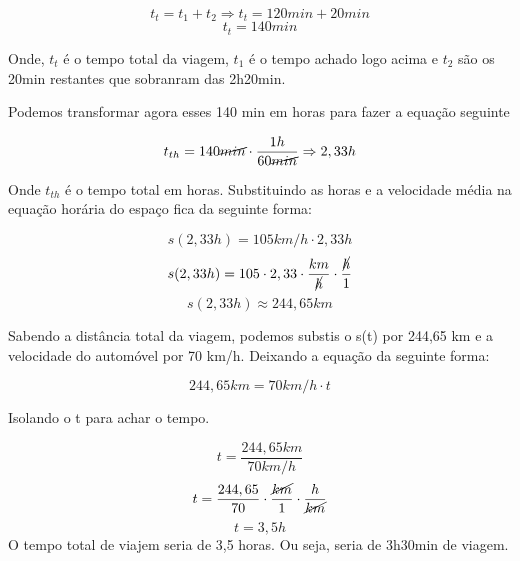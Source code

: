 \documentclass[a4paper, 12pt]{article}
\begin{document}
\begin{flushleft}
		\begin{equation*}
			t_t = t_1 + t_2 \Rightarrow t_t = 120 min + 20 min
		\end{equation*}
		\begin{equation*}
			t_t = 140 min
		\end{equation*}
		
		
		Onde, $t_t$ é o tempo total da viagem, $t_1$ é o tempo achado logo acima e $t_2$ são os 20min restantes que sobranram das 2h20min. 
		
		Podemos transformar agora esses 140 min em horas para fazer a equação seguinte
		
		\begin{equation*}
			t_{th}= 140 \cancel{min} \cdot \frac{1h}{60 \cancel{min}} \Rightarrow 2,33 h 
		\end{equation*}
		
		Onde $t_{th}$ é o tempo total em horas. Substituindo as horas e a velocidade média na equação horária do espaço fica da seguinte forma:
		
		\begin{equation*}
			s(2,33h) =105 km/h \cdot 2,33h
		\end{equation*}
		\begin{equation*}
			s(2,33h) =105 \cdot 2,33 \cdot \frac{km}{\cancel{h}} \cdot \frac{\cancel{h}}{1}
		\end{equation*}
		\begin{equation*}
			s(2,33h) \approx 244,65 km
		\end{equation*}
		
		Sabendo a distância total da viagem, podemos substis o s(t) por 244,65 km e a velocidade do automóvel por 70 km/h. Deixando a equação da seguinte forma:
		
		\begin{equation*}
			244,65 km = 70 km/h \cdot t 
		\end{equation*}
		
		Isolando o t para achar o tempo.
		
		\begin{equation*}
			t = \frac{244,65 km}{70 km/h} 
		\end{equation*}
		\begin{equation*}
			t = \frac{244,65}{70} \cdot \frac{\cancel{km}}{1} \cdot \frac{h}{\cancel{km}} 
		\end{equation*}
		\begin{equation*}
			t = 3,5h 
		\end{equation*}
		O tempo total de viajem seria de 3,5 horas. Ou seja, seria de 3h30min de viagem.
		

\end{flushleft}
\end{document}
